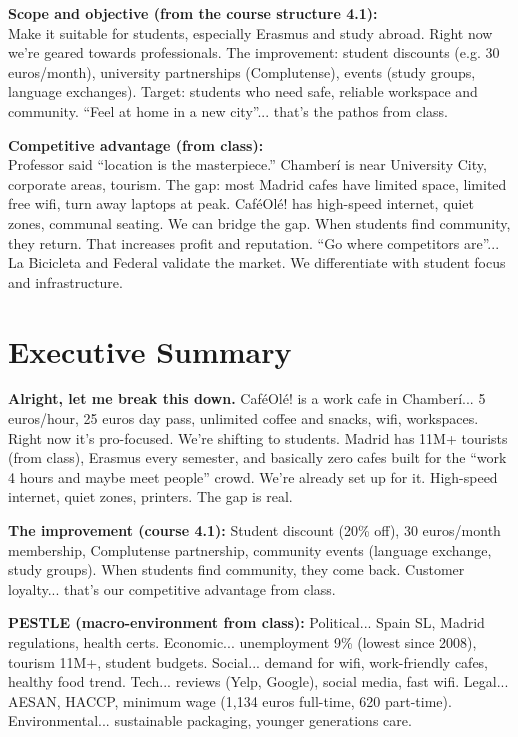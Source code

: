 \documentclass[12pt,a4paper]{article}
\begin{document}
\textbf{Scope and objective (from the course structure 4.1):}\\
Make it suitable for students, especially Erasmus and study abroad. Right now we're geared towards professionals. The improvement: student discounts (e.g. 30 euros/month), university partnerships (Complutense), events (study groups, language exchanges). Target: students who need safe, reliable workspace and community. ``Feel at home in a new city''... that's the pathos from class.

\textbf{Competitive advantage (from class):}\\
Professor said ``location is the masterpiece.'' Chamber\'i is near University City, corporate areas, tourism. The gap: most Madrid cafes have limited space, limited free wifi, turn away laptops at peak. Caf\'eOl\'e! has high-speed internet, quiet zones, communal seating. We can bridge the gap. When students find community, they return. That increases profit and reputation. ``Go where competitors are''... La Bicicleta and Federal validate the market. We differentiate with student focus and infrastructure.

\vspace{0.5em}
\noindent{\color{sectionblue}\rule{\textwidth}{0.4pt}}

\section*{\color{sectionblue}Executive Summary}\label{sec:exec}

\textbf{Alright, let me break this down.} Caf\'eOl\'e! is a work cafe in Chamber\'i... 5 euros/hour, 25 euros day pass, unlimited coffee and snacks, wifi, workspaces. Right now it's pro-focused. We're shifting to students. Madrid has 11M+ tourists (from class), Erasmus every semester, and basically zero cafes built for the ``work 4 hours and maybe meet people'' crowd. We're already set up for it. High-speed internet, quiet zones, printers. The gap is real.

\textbf{The improvement (course 4.1):} Student discount (20\% off), 30 euros/month membership, Complutense partnership, community events (language exchange, study groups). When students find community, they come back. Customer loyalty... that's our competitive advantage from class.

\textbf{PESTLE (macro-environment from class):} Political... Spain SL, Madrid regulations, health certs. Economic... unemployment 9\% (lowest since 2008), tourism 11M+, student budgets. Social... demand for wifi, work-friendly cafes, healthy food trend. Tech... reviews (Yelp, Google), social media, fast wifi. Legal... AESAN, HACCP, minimum wage (1,134 euros full-time, 620 part-time). Environmental... sustainable packaging, younger generations care.
\end{document}
